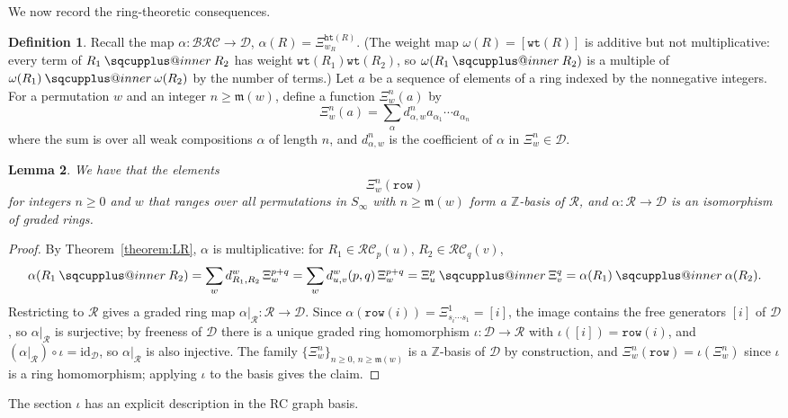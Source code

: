 \documentclass{amsart}
\makeatletter
\newcommand{\sqcupplus@inner}[2]{%
  \vcenter{\hbox{\ooalign{%
    \hfil$\m@th#1\sqcup$\hfil\cr
    \hfil\raisebox{0.15ex}{$\m@th#1\scriptscriptstyle+$}\hfil\cr
  }}}%
}
\newcommand{\sqcupplus}{\mathbin{\mathpalette\sqcupplus@inner\relax}}
\newtheorem{lemma}{Lemma}[subsection]
\theoremstyle{definition}
\newtheorem{definition}[lemma]{Definition}
\theoremstyle{remark}
\numberwithin{equation}{subsection}
\newcommand{\wof}[1]{w_{#1}}
\newcommand{\wtt}{\mathtt{wt}}
\newcommand{\hr}{\mathtt{ht}}
\newcommand{\BRC}{\mathcal{BRC}}
\newcommand{\RC}{\mathcal{RC}}
\newcommand{\dsch}{\ensuremath{\Xi}}
\newcommand{\dcoma}{\mathcal{D}}
\newcommand{\maxd}{\mathfrak{m}}
\makeatother
\begin{document}
We now record the ring-theoretic consequences.

\begin{definition}
Recall the map $\alpha:\BRC\to\dcoma$, $\alpha(R)=\dsch_{\wof{R}}^{\hr(R)}$. (The weight map $\omega(R)=[\wtt(R)]$ is additive but not multiplicative: every term of $R_1\sqcupplus R_2$ has weight $\wtt(R_1)\wtt(R_2)$, so $\omega(R_1\sqcupplus R_2)$ is a multiple of $\omega(R_1)\sqcupplus\omega(R_2)$ by the number of terms.) Let $a$ be a sequence of elements of a ring indexed by the nonnegative integers. For a permutation $w$ and an integer $n\geq \maxd(w)$, define a function $\dsch_w^n(a)$ by
$$\dsch_w^n(a) = \sum_{\alpha} d_{\alpha, w}^n a_{\alpha_1} \cdots a_{\alpha_n}$$
where the sum is over all weak compositions $\alpha$ of length $n$, and $d_{\alpha, w}^n$ is the coefficient of $\alpha$ in $\dsch_w^n\in\dcoma$.
\end{definition}

\begin{lemma} \label{lemma:schubertrow}
We have that the elements
$$\dsch_w^n(\mathtt{row})$$
for integers $n\geq 0$ and $w$ that ranges over all permutations in $S_\infty$ with $n\geq \maxd(w)$ form a $\mathbb{Z}$-basis of $\mathcal{R}$, and $\alpha:\mathcal{R}\to \dcoma$ is an isomorphism of graded rings.
\end{lemma}
\begin{proof}
By Theorem~\ref{theorem:LR}, $\alpha$ is multiplicative: for $R_1\in\RC_p(u)$, $R_2\in\RC_q(v)$,
$$\alpha(R_1\sqcupplus R_2)=\sum_w d_{R_1,R_2}^w\,\dsch_w^{p+q}=\sum_w d_{u,v}^w(p,q)\,\dsch_w^{p+q}=\dsch_u^p\sqcupplus\dsch_v^q=\alpha(R_1)\sqcupplus\alpha(R_2)\text{.}$$
Restricting to $\mathcal{R}$ gives a graded ring map $\alpha|_{\mathcal{R}}:\mathcal{R}\to\dcoma$. Since $\alpha(\mathtt{row}(i))=\dsch^1_{s_i\cdots s_1}=[i]$, the image contains the free generators $[i]$ of $\dcoma$, so $\alpha|_{\mathcal{R}}$ is surjective; by freeness of $\dcoma$ there is a unique graded ring homomorphism $\iota:\dcoma\to\mathcal{R}$ with $\iota([i])=\mathtt{row}(i)$, and $(\alpha|_{\mathcal{R}})\circ\iota=\mathrm{id}_{\dcoma}$, so $\alpha|_{\mathcal{R}}$ is also injective. The family $\{\dsch_w^n\}_{n\ge 0,\, n\ge\maxd(w)}$ is a $\mathbb{Z}$-basis of $\dcoma$ by construction, and $\dsch_w^n(\mathtt{row})=\iota(\dsch_w^n)$ since $\iota$ is a ring homomorphism; applying $\iota$ to the basis gives the claim.
\end{proof}

The section $\iota$ has an explicit description in the RC graph basis.
\end{document}
